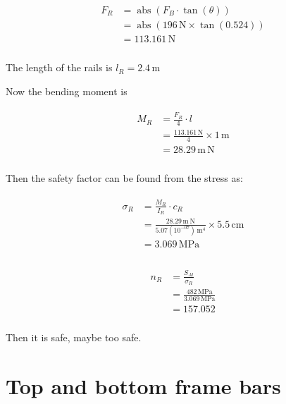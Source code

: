 \documentclass{article}
\begin{document}
\begin{align}
\begin{split}
F_{R}	&= \operatorname{abs}{\left (F_{B} \cdot \tan{\left (\theta \right )} \right )}\\
		&= \operatorname{abs}{\left (196\,\mathrm{N} \times \tan{\left (0.524 \right )} \right )}\\
		&= 113.161\,\mathrm{N}\\
\end{split}
\end{align}

The length of the rails is $l_{R} = 2.4\,\mathrm{m}$

Now the bending moment is

\begin{align}
\begin{split}
M_{R}	&= \frac{F_{R}}{4} \cdot l\\
		&= \frac{113.161\,\mathrm{N}}{4} \times 1\,\mathrm{m}\\
		&= 28.29\,\mathrm{m \, N}\\
\end{split}
\end{align}

Then the safety factor can be found from the stress as:

\begin{align}
\begin{split}
\sigma_{R}	&= \frac{M_{R}}{I_{R}} \cdot c_{R}\\
			&= \frac{28.29\,\mathrm{m \, N}}{5.07(10^{-07})\,\mathrm{m^{4}}} \times 5.5\,\mathrm{cm}\\
			&= 3.069\,\mathrm{MPa}\\
\end{split}
\end{align}

\begin{align}
\begin{split}
n_{R}	&= \frac{S_{Al}}{\sigma_{R}}\\
		&= \frac{482\,\mathrm{MPa}}{3.069\,\mathrm{MPa}}\\
		&= 157.052\\
\end{split}
\end{align}

Then it is safe, maybe too safe.

\section{Top and bottom frame bars}
\end{document}
